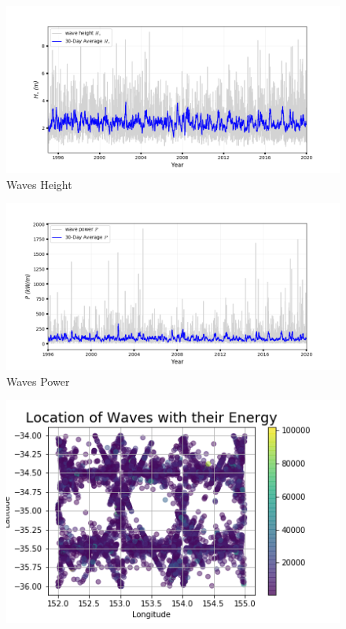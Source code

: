 \documentclass[12pt]{article}
\begin{document}
\begin{figure}[h]
    \centering
    \includegraphics[scale=0.31]{Hseries.png}
    \caption{Waves Height}
    \label{fig:fig2}
\end{figure}

\begin{figure}[h]
    \centering
    \includegraphics[scale=0.31]{Pseries.png}
    \caption{Waves Power}
    \label{fig:fig3}
\end{figure}

\begin{figure}[h]
    \centering
    \includegraphics[scale=0.45]{wave_location.png}
    \caption{}
    \label{fig:fig4}
\end{figure}
\end{document}
